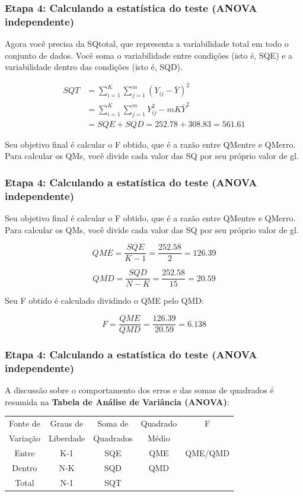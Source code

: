 \documentclass[11pt]{beamer}
\begin{document}
\begin{frame}
\frametitle{Etapa 4: Calculando a estatística do teste (ANOVA independente)}
Agora você precisa da SQtotal, que representa a variabilidade total em todo o conjunto de dados. Você soma o variabilidade entre condições (isto é, SQE) e a variabilidade dentro das condições (isto é, SQD).

\begin{align*}
SQT &= \sum_{i=1}^K\sum_{j=1}^m (Y_{ij}-\bar{Y})^2 \\
    &= \sum_{i=1}^K\sum_{j=1}^m Y_{ij}^2 -mK\bar{Y}^2\\
    &= SQE + SQD = 252.78 + 308.83 = 561.61
\end{align*}

Seu objetivo final é calcular o F obtido, que é a razão entre QMentre e QMerro. Para calcular os QMs, você divide cada valor das SQ por seu próprio valor de gl.
\end{frame}

\begin{frame}
\frametitle{Etapa 4: Calculando a estatística do teste (ANOVA independente)}

Seu objetivo final é calcular o F obtido, que é a razão entre QMentre e QMerro. Para calcular os QMs, você divide cada valor das SQ por seu próprio valor de gl.

\[QME = \frac{SQE}{K-1}=\frac{252.58}{2} = 126.39\]

\[QMD = \frac{SQD}{N-K}=\frac{252.58}{15} = 20.59\]

Seu F obtido é calculado dividindo o QME pelo QMD:

\[F = \frac{QME}{QMD} = \frac{126.39}{20.59} = 6.138\]
 
\end{frame}


\begin{frame}
\frametitle{Etapa 4: Calculando a estatística do teste (ANOVA independente)}
A discussão sobre o comportamento dos erros e das somas de quadrados é resumida na \textbf{Tabela de Análise de Variância (ANOVA)}:

\begin{table}[h]
\centering
\begin{tabular}{ccccc}
\hline
Fonte de & Graus de & Soma de & Quadrado & F  \\
Variação & Liberdade & Quadrados & Médio &   \\
\hline
Entre & K-1 & SQE & QME & QME/QMD   \\
Dentro & N-K & SQD & QMD &   \\
\hline
Total & N-1 & SQT &  &   \\
\hline
\end{tabular}

\end{table}
\end{frame}
\end{document}
